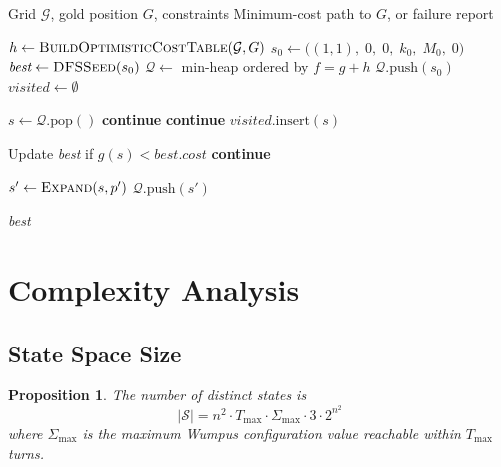 \documentclass[12pt,a4paper]{article}
\newtheorem{proposition}[theorem]{Proposition}
\begin{document}
\begin{algorithm}[H]
\caption{Wumpus World A* Solver}
\begin{algorithmic}[1]
\Require Grid $\mathcal{G}$, gold position $G$, constraints
\Ensure Minimum-cost path to $G$, or failure report

\State $h \leftarrow \textsc{BuildOptimisticCostTable}(\mathcal{G}, G)$
\State $s_0 \leftarrow \bigl((1,1),\; 0,\; 0,\; k_0,\; M_0,\; 0\bigr)$
\State $\textit{best} \leftarrow \textsc{DFSSeed}(s_0)$
\State $\mathcal{Q} \leftarrow$ min-heap ordered by $f = g + h$
\State $\mathcal{Q}.\text{push}(s_0)$
\State $\textit{visited} \leftarrow \emptyset$

  \State $s \leftarrow \mathcal{Q}.\text{pop}()$
   \textbf{continue} \EndIf
   \textbf{continue} \EndIf
  \State $\textit{visited}.\text{insert}(s)$

    \State Update \textit{best} if $g(s) < \textit{best.cost}$
    \State \textbf{continue}
  \EndIf

    \State $s' \leftarrow \textsc{Expand}(s, p')$
      \State $\mathcal{Q}.\text{push}(s')$
    \EndIf
  \EndFor
\EndWhile

\State \Return \textit{best}
\end{algorithmic}
\end{algorithm}

\section{Complexity Analysis}

\subsection{State Space Size}

\begin{proposition}
The number of distinct states is
\[
  |\mathcal{S}| = n^2 \cdot T_{\max} \cdot \Sigma_{\max} \cdot 3 \cdot 2^{n^2}
\]
where $\Sigma_{\max}$ is the maximum Wumpus configuration value reachable
within $T_{\max}$ turns.
\end{proposition}
\end{document}
